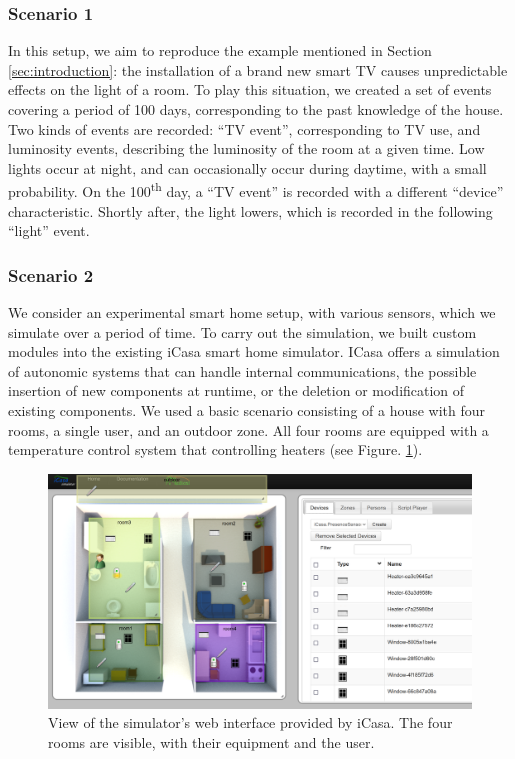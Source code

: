 \documentclass[entropy,article,submit,moreauthors,pdftex]{Definitions/mdpi}
\begin{document}
\subsubsection{Scenario 1}
In this setup, we aim to reproduce the example mentioned in Section \ref{sec:introduction}: the installation of a brand new smart TV causes unpredictable effects on the light of a room.
To play this situation, we created a set of events covering a period of 100 days, corresponding to the past knowledge of the house. Two kinds of events are recorded: ``TV event'', corresponding to TV use, and luminosity events, describing the luminosity of the room at a given time. Low lights occur at night, and can occasionally occur during daytime, with a small probability. On the 100\textsuperscript{th} day, a ``TV event'' is recorded with a different ``device'' characteristic. Shortly after, the light lowers, which is recorded in the following ``light'' event.

\subsubsection{Scenario 2}
We consider an experimental smart home setup, with various sensors, which we simulate over a period of time.
To carry out the simulation, we built custom modules into the existing iCasa
smart home simulator\cite{lalanda_self-aware_2017}. ICasa
offers a simulation of autonomic systems that can handle internal communications,
the possible insertion of new components at runtime, or the deletion or modification of existing
components. We used a basic scenario consisting of a house with four rooms,
a single user, and an outdoor zone. All four rooms are equipped
with a temperature control system that controlling heaters (see Figure.
\ref{fig:view}).

\begin{figure}[ht]
    \centering
    \includegraphics[width=.8\linewidth]{figures/icasa_interface.png}
    \caption{View of the simulator's web interface provided by iCasa. The four
        rooms are visible, with their equipment and the user.}
    \label{fig:view}
\end{figure}
\end{document}
